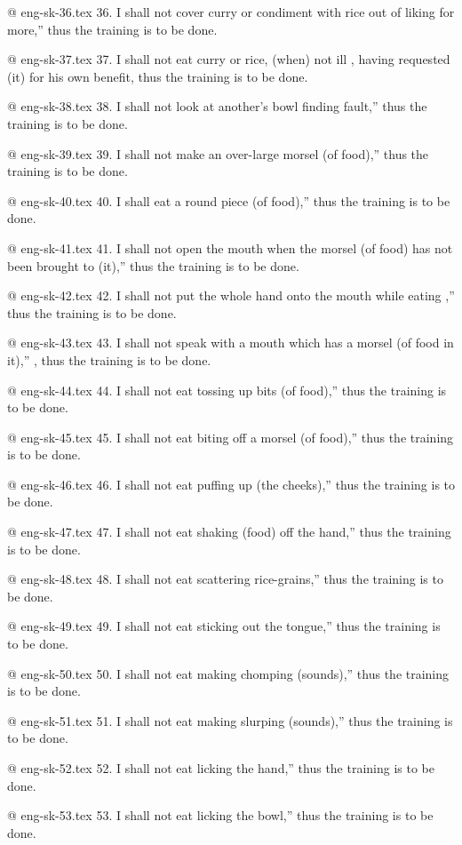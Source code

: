 @ eng-sk-36.tex
36. I shall not cover curry or condiment with rice out of liking for more,” thus the training is to be done.

@ eng-sk-37.tex
37. I shall not eat curry or rice, (when) not ill , having requested (it) for his own benefit, thus the training is to be done.

@ eng-sk-38.tex
38. I shall not look at another's bowl finding fault,” thus the training is to be done.

@  eng-sk-39.tex
39. I shall not make an over-large morsel (of food),” thus the training is to be done.

@  eng-sk-40.tex
40. I shall eat a round piece (of food),” thus the training is to be done.

@  eng-sk-41.tex
41. I shall not open the mouth when the morsel (of food) has not been brought to (it),” thus the training is to be done.

@  eng-sk-42.tex
42. I shall not put the whole hand onto the mouth while eating ,” thus the training is to be done.

@  eng-sk-43.tex
43. I shall not speak with a mouth which has a morsel (of food in it),” , thus the training is to be done.

@  eng-sk-44.tex
44. I shall not eat tossing up bits (of food),” thus the training is to be done.

@  eng-sk-45.tex
45. I shall not eat biting off a morsel (of food),” thus the training is to be done.

@  eng-sk-46.tex
46. I shall not eat puffing up (the cheeks),” thus the training is to be done.

@  eng-sk-47.tex
47. I shall not eat shaking (food) off the hand,” thus the training is to be done.

@  eng-sk-48.tex
48. I shall not eat scattering rice-grains,” thus the training is to be done.

@  eng-sk-49.tex
49. I shall not eat sticking out the tongue,” thus the training is to be done.

@  eng-sk-50.tex
50. I shall not eat making chomping (sounds),” thus the training is to be done.

@  eng-sk-51.tex
51. I shall not eat making slurping (sounds),” thus the training is to be done.

@  eng-sk-52.tex
52. I shall not eat licking the hand,” thus the training is to be done.

@  eng-sk-53.tex
53. I shall not eat licking the bowl,” thus the training is to be done.

